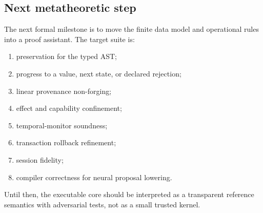 \subsection{Next metatheoretic step}

The next formal milestone is to move the finite data model and operational rules
into a proof assistant.  The target suite is:
\begin{enumerate}[leftmargin=1.7em]
  \item preservation for the typed AST;
  \item progress to a value, next state, or declared rejection;
  \item linear provenance non-forging;
  \item effect and capability confinement;
  \item temporal-monitor soundness;
  \item transaction rollback refinement;
  \item session fidelity;
  \item compiler correctness for neural proposal lowering.
\end{enumerate}
Until then, the executable core should be interpreted as a transparent
reference semantics with adversarial tests, not as a small trusted kernel.
